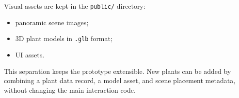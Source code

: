 \documentclass[12pt,a4paper]{article}
\begin{document}
Visual assets are kept in the \texttt{public/} directory:

\begin{itemize}
    \item panoramic scene images;
    \item 3D plant models in \texttt{.glb} format;
    \item UI assets.
\end{itemize}

This separation keeps the prototype extensible. New plants can be added by
combining a plant data record, a model asset, and scene placement metadata,
without changing the main interaction code.
\end{document}
